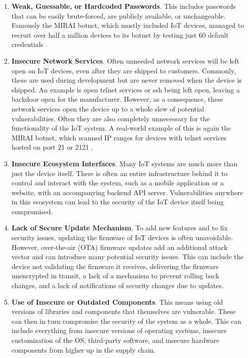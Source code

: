 \begin{enumerate}
    \item \textbf{Weak, Guessable, or Hardcoded Passwords}. This includes passwords that can be easily brute-forced, are publicly available, or unchangeable. Famously the MIRAI botnet, which mostly included IoT devices, managed to recruit over half a million devices to its botnet by testing just 60 default credentials \cite{understanding-mirai}.
    
    \item \textbf{Insecure Network Services}. Often unneeded network services will be left open on IoT devices, even after they are shipped to customers. Commonly, these are used during development but are never removed when the device is shipped. An example is open telnet services or ssh being left open, leaving a backdoor open for the manufacturer. However, as a consequence, these network services open the device up to a whole slew of potential vulnerabilities. Often they are also completely unnecessary for the functionality of the IoT system. A real-world example of this is again the MIRAI botnet, which scanned IP ranges for devices with telnet services hosted on port 21 or 2121 \cite{understanding-mirai}.
    
    \item \textbf{Insecure Ecosystem Interfaces}. Many IoT systems are much more than just the device itself. There is often an entire infrastructure behind it to control and interact with the system, such as a mobile application or a website, with an accompanying backend API server. Vulnerabilities anywhere in this ecosystem can lead to the security of the IoT device itself being compromised.
    
    \item \textbf{Lack of Secure Update Mechanism}. To add new features and to fix security issues, updating the firmware of IoT devices is often unavoidable. However, over-the-air (OTA) firmware updates add an additional attack vector and can introduce many potential security issues. This can include the device not validating the firmware it receives, delivering the firmware unencrypted in transit, a lack of a mechanism to prevent rolling back changes, and a lack of notifications of security changes due to updates.
    
    \item \textbf{Use of Insecure or Outdated Components}. This means using old versions of libraries and components that themselves are vulnerable. These can then in turn compromise the security of the system as a whole. This can include everything from insecure versions of operating systems, insecure customization of the OS, third-party software, and insecure hardware components from higher up in the supply chain.
    

\end{enumerate}

